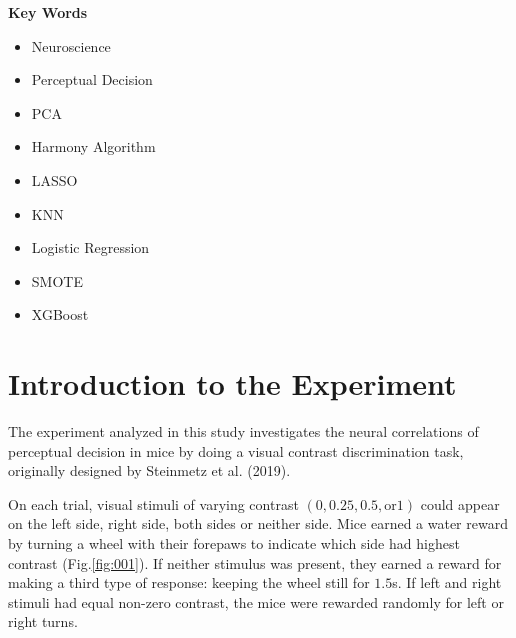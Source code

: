 \documentclass{article}
\begin{document}
	\par \textbf{Key Words}
	\begin{itemize}
		\item Neuroscience
		\item Perceptual Decision
		\item PCA
		\item Harmony Algorithm
		\item LASSO
		\item KNN
		\item Logistic Regression
		\item SMOTE
		\item XGBoost
	\end{itemize}
	\clearpage
	\section{Introduction to the Experiment}
	\par The experiment analyzed in this study investigates the neural correlations of perceptual decision in mice by doing a visual contrast discrimination task, originally designed by Steinmetz et al. (2019)\cite{ref1}.
	\par On each trial, visual stimuli of varying contrast $(0, 0.25, 0.5, \mbox{or} 1)$ could appear on the left side, right side, both sides or neither side. Mice earned a water reward by turning a wheel with their forepaws to indicate which side had highest contrast (Fig.\ref{fig:001}). If neither stimulus was present, they earned a reward for making a third type of response: keeping the wheel still for $1.5$s. If left and right stimuli had equal non-zero contrast, the mice were rewarded randomly for left or right turns.
\end{document}
